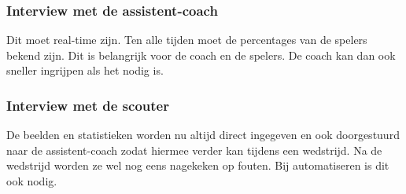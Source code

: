 \begin{enumerate}
  \subsubsection{Interview met de assistent-coach}
  Dit moet real-time zijn. Ten alle tijden moet de percentages van de spelers bekend zijn. Dit is belangrijk voor de coach en de spelers. De coach kan dan ook sneller ingrijpen als het nodig is.
  \subsubsection{Interview met de scouter}
  De beelden en statistieken worden nu altijd direct ingegeven en ook doorgestuurd naar de assistent-coach zodat hiermee verder kan tijdens een wedstrijd. Na de wedstrijd worden ze wel nog eens nagekeken op fouten. Bij automatiseren is dit ook nodig.
\end{enumerate}

